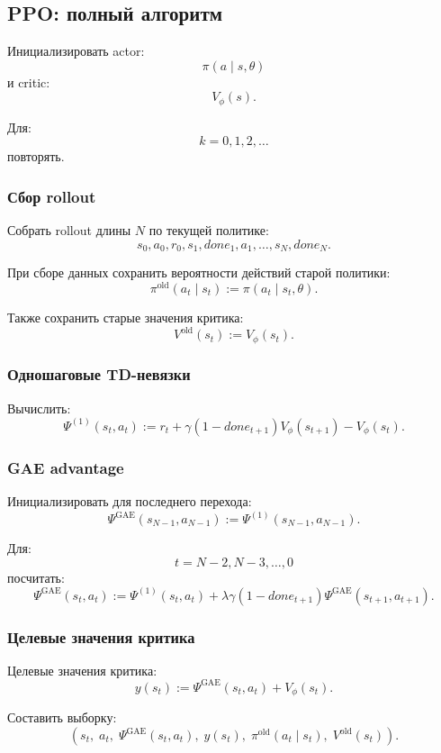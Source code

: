 \documentclass[12pt,a4paper]{article}
\begin{document}
\subsection{PPO: полный алгоритм}

Инициализировать actor:
\[
\pi(a\mid s,\theta)
\]
и critic:
\[
V_\phi(s).
\]

Для:
\[
k=0,1,2,\ldots
\]
повторять.

\subsubsection{Сбор rollout}

Собрать rollout длины $N$ по текущей политике:
\[
s_0,a_0,r_0,s_1,done_1,a_1,\ldots,s_N,done_N.
\]

При сборе данных сохранить вероятности действий старой политики:
\[
\pi^{\mathrm{old}}(a_t\mid s_t)
:=
\pi(a_t\mid s_t,\theta).
\]

Также сохранить старые значения критика:
\[
V^{\mathrm{old}}(s_t)
:=
V_\phi(s_t).
\]

\subsubsection{Одношаговые TD-невязки}

Вычислить:
\[
\Psi^{(1)}(s_t,a_t)
:=
r_t
+
\gamma(1-done_{t+1})V_\phi(s_{t+1})
-
V_\phi(s_t).
\]

\subsubsection{GAE advantage}

Инициализировать для последнего перехода:
\[
\Psi^{\mathrm{GAE}}(s_{N-1},a_{N-1})
:=
\Psi^{(1)}(s_{N-1},a_{N-1}).
\]

Для:
\[
t=N-2,N-3,\ldots,0
\]
посчитать:
\[
\Psi^{\mathrm{GAE}}(s_t,a_t)
:=
\Psi^{(1)}(s_t,a_t)
+
\lambda\gamma(1-done_{t+1})
\Psi^{\mathrm{GAE}}(s_{t+1},a_{t+1}).
\]

\subsubsection{Целевые значения критика}

Целевые значения критика:
\[
y(s_t)
:=
\Psi^{\mathrm{GAE}}(s_t,a_t)
+
V_\phi(s_t).
\]

Составить выборку:
\[
\left(
s_t,\;
a_t,\;
\Psi^{\mathrm{GAE}}(s_t,a_t),\;
y(s_t),\;
\pi^{\mathrm{old}}(a_t\mid s_t),\;
V^{\mathrm{old}}(s_t)
\right).
\]
\end{document}
